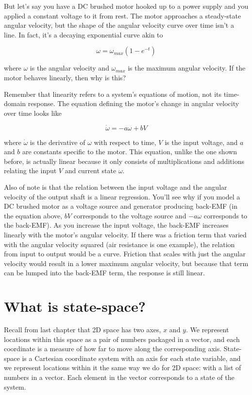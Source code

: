 But let's say you have a DC brushed motor hooked up to a power supply and you
applied a constant voltage to it from rest. The motor approaches a steady-state
angular velocity, but the shape of the angular velocity curve over time isn't a
line. In fact, it's a decaying exponential curve akin to

\begin{equation*}
  \omega = \omega_{max}\left(1 - e^{-t}\right)
\end{equation*}

where $\omega$ is the angular velocity and $\omega_{max}$ is the maximum angular
velocity. If the motor behaves linearly, then why is this?

Remember that linearity refers to a system's equations of motion, not its
time-domain response. The equation defining the motor's change in angular
velocity over time looks like

\begin{equation*}
  \dot{\omega} = -a\omega + bV
\end{equation*}

where $\dot{\omega}$ is the derivative of $\omega$ with respect to time, $V$ is
the input voltage, and $a$ and $b$ are constants specific to the motor. This
equation, unlike the one shown before, is actually linear because it only
consists of multiplications and additions relating the input $V$ and current
state $\omega$.

Also of note is that the relation between the input voltage and the angular
velocity of the output shaft is a linear regression. You'll see why if you model
a DC brushed motor as a voltage source and generator producing back-EMF (in the
equation above, $bV$ corresponds to the voltage source and $-a\omega$
corresponds to the back-EMF). As you increase the input voltage, the back-EMF
increases linearly with the motor's angular velocity. If there was a friction
term that varied with the angular velocity squared (air resistance is one
example), the relation from input to output would be a curve. Friction that
scales with just the angular velocity would result in a lower maximum angular
velocity, but because that term can be lumped into the back-EMF term, the
response is still linear.

\section{What is state-space?}

Recall from last chapter that 2D space has two axes, $x$ and $y$. We represent
locations within this space as a pair of numbers packaged in a vector, and each
coordinate is a measure of how far to move along the corresponding axis.
State-space is a Cartesian coordinate system with an axis for each \gls{state}
variable, and we represent locations within it the same way we do for 2D space:
with a list of numbers in a vector. Each element in the vector corresponds to a
\gls{state} of the \gls{system}.

